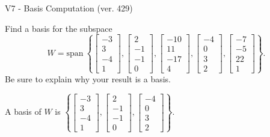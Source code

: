\begin{exercise}
  \begin{exerciseTitle}V7 - Basis Computation (ver. 429)\end{exerciseTitle}
  \begin{exerciseStatement}
    Find a basis for the subspace 
\[W=\mathrm{span}\ \left\{\left[\begin{array}{r}
-3 \\
3 \\
-4 \\
1
\end{array}\right] , \left[\begin{array}{r}
2 \\
-1 \\
-1 \\
0
\end{array}\right] , \left[\begin{array}{r}
-10 \\
11 \\
-17 \\
4
\end{array}\right] , \left[\begin{array}{r}
-4 \\
0 \\
3 \\
2
\end{array}\right] , \left[\begin{array}{r}
-7 \\
-5 \\
22 \\
1
\end{array}\right]\right\}.\]
 Be sure to explain why your result is a basis.


  \end{exerciseStatement}
  \begin{exerciseAnswer}
   A basis of \(W\) is  \(\left\{\left[\begin{array}{r}
-3 \\
3 \\
-4 \\
1
\end{array}\right] , \left[\begin{array}{r}
2 \\
-1 \\
-1 \\
0
\end{array}\right] , \left[\begin{array}{r}
-4 \\
0 \\
3 \\
2
\end{array}\right]\right\}\).
  


  \end{exerciseAnswer}
\end{exercise}